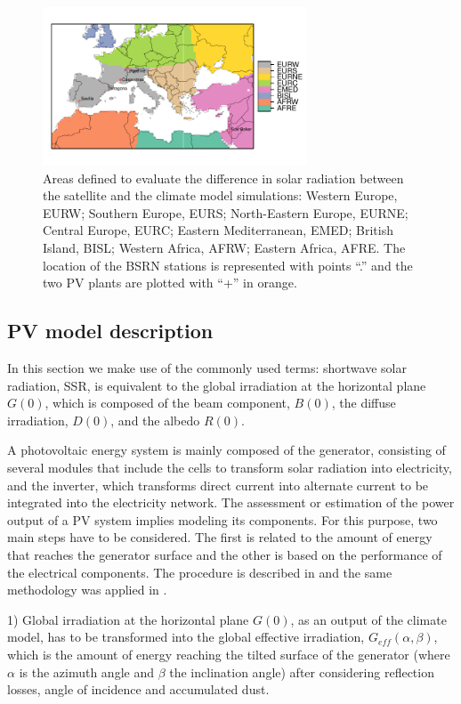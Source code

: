 \begin{figure}[h!]
\centering\includegraphics[width=0.7\textwidth]{figs/capitulo6/zonasPuntosLabel.pdf}
\caption{Areas defined to evaluate the difference in solar radiation between the satellite and the climate model simulations: Western Europe, EURW; Southern Europe, EURS; North-Eastern Europe, EURNE; Central Europe, EURC; Eastern Mediterranean, EMED; British Island, BISL; Western Africa, AFRW; Eastern Africa, AFRE. The location of the BSRN stations is represented with points ``.'' and the two PV plants are plotted with ``+'' in orange.}
\label{fig:mapapral}
\end{figure}

 
\subsection{PV model description}

In this section we make use of the commonly used terms: shortwave solar radiation, SSR, is equivalent to the global irradiation at the horizontal plane $G(0)$, which is composed of the beam component, $B(0)$, the diffuse irradiation, $D(0)$, and the albedo $R(0)$.

A photovoltaic energy system is mainly composed of the generator, consisting of several modules that include the cells to transform solar radiation into electricity, and the inverter, which transforms direct current into alternate current to be integrated into the electricity network. The assessment or estimation of the power output of a PV system implies modeling its components. For this purpose, two main steps have to be considered. The first is related to the amount of energy that reaches the generator surface and the other is based on the performance of the electrical components. The procedure is described in \cite{Perpinan2009} and the same methodology was applied in \cite{Gutierrez2017}.

1) Global irradiation at the horizontal plane $G(0)$, as an output of the climate model, has to be transformed into the global effective irradiation, $G_{eff}(\alpha, \beta)$, which is the amount of energy reaching the tilted surface of the generator (where $\alpha$ is the azimuth angle and $\beta$ the inclination angle) after considering reflection losses, angle of incidence and accumulated dust.  


